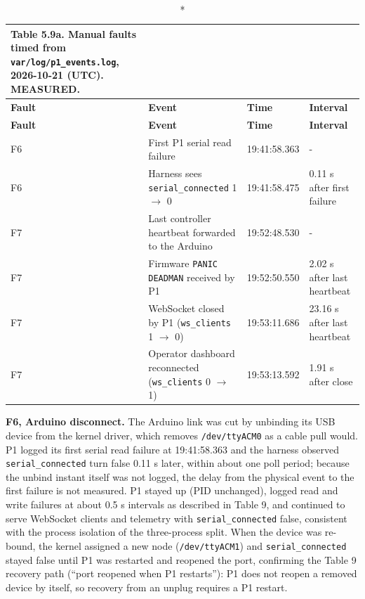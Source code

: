 \begin{center}
\begin{longtable}{|l|p{5cm}|l|p{3cm}|}
\caption*{Table 5.9a. Manual faults timed from \texttt{var/log/p1\_events.log}, 2026-10-21 (UTC). MEASURED.}
\addcontentsline{lot}{table}{\protect\numberline{5.9a}Manual faults timed from \texttt{var/log/p1\_events.log}, 2026-10-21 (UTC). MEASURED.}
\\
\hline
\textbf{Fault} & \textbf{Event} & \textbf{Time} & \textbf{Interval} \\
\hline
\endfirsthead
\hline
\textbf{Fault} & \textbf{Event} & \textbf{Time} & \textbf{Interval} \\
\hline
\endhead
F6 & First P1 serial read failure & 19:41:58.363 & - \\
\hline
F6 & Harness sees \texttt{serial\_connected} 1 $\rightarrow$ 0 & 19:41:58.475 & 0.11 s after first failure \\
\hline
F7 & Last controller heartbeat forwarded to the Arduino & 19:52:48.530 & - \\
\hline
F7 & Firmware \texttt{PANIC DEADMAN} received by P1 & 19:52:50.550 & 2.02 s after last heartbeat \\
\hline
F7 & WebSocket closed by P1 (\texttt{ws\_clients} 1 $\rightarrow$ 0) & 19:53:11.686 & 23.16 s after last heartbeat \\
\hline
F7 & Operator dashboard reconnected (\texttt{ws\_clients} 0 $\rightarrow$ 1) & 19:53:13.592 & 1.91 s after close \\
\hline
\end{longtable}
\end{center}

\textbf{F6, Arduino disconnect.} The Arduino link was cut by unbinding its USB device from the kernel driver, which removes \texttt{/dev/ttyACM0} as a cable pull would. P1 logged its first serial read failure at 19:41:58.363 and the harness observed \texttt{serial\_connected} turn false 0.11 s later, within about one poll period; because the unbind instant itself was not logged, the delay from the physical event to the first failure is not measured. P1 stayed up (PID unchanged), logged read and write failures at about 0.5 s intervals as described in Table 9, and continued to serve WebSocket clients and telemetry with \texttt{serial\_connected} false, consistent with the process isolation of the three-process split. When the device was re-bound, the kernel assigned a new node (\texttt{/dev/ttyACM1}) and \texttt{serial\_connected} stayed false until P1 was restarted and reopened the port, confirming the Table 9 recovery path (``port reopened when P1 restarts''): P1 does not reopen a removed device by itself, so recovery from an unplug requires a P1 restart.


